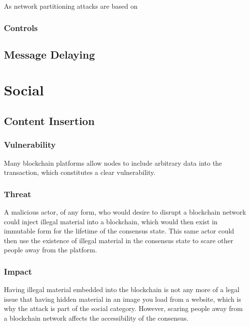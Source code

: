 \documentclass[11pt,a4paper,draft]{article}
\begin{document}
As network partitioning attacks are based on

\subsubsection{Controls}

\subsection{Message Delaying}

\section{Social}

\subsection{Content Insertion}

\subsubsection{Vulnerability}

Many blockchain platforms allow nodes to include arbitrary data into the transaction, which constitutes a clear vulnerability.\\

\subsubsection{Threat}

A malicious actor, of any form, who would desire to disrupt a blockchain network could inject illegal material into a blockchain, which would then exist in immutable form for the lifetime of the consensus state. This same actor could then use the existence of illegal material in the consensus state to scare other people away from the platform.\\

\subsubsection{Impact}

Having illegal material embedded into the blockchain is not any more of a legal issue that having hidden material in an image you load from a website, which is why the attack is part of the social category. However, scaring people away from a blockchain network affects the accessibility of the consensus.\\
\end{document}
